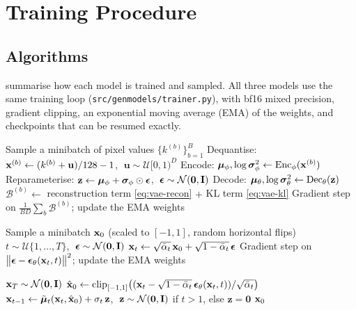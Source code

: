 \section{Training Procedure}
\label{sec:training}

\subsection{Algorithms}
 summarise how each model is trained and sampled.
All three models use the same training loop (\texttt{src/genmodels/trainer.py}), with bf16 mixed precision,
gradient clipping, an exponential moving average (EMA) of the weights, and checkpoints that can be resumed exactly.

\begin{algorithm}[H]
\caption{VAE training (one step, both VAE variants)}
\label{alg:vae-train}
\begin{algorithmic}[1]
\State Sample a minibatch of pixel values $\{k^{(b)}\}_{b=1}^{B}$
\State Dequantise: $\mathbf{x}^{(b)} \gets (k^{(b)}+\mathbf{u})/128-1$, $\;\mathbf{u}\sim\mathcal{U}[0,1)^{D}$
\State Encode: $\bm{\mu}_\phi,\log\bm{\sigma}^2_\phi \gets \mathrm{Enc}_\phi(\mathbf{x}^{(b)})$
\State Reparameterise: $\mathbf{z} \gets \bm{\mu}_\phi + \bm{\sigma}_\phi\odot\bm{\epsilon}$, $\;\bm{\epsilon}\sim\mathcal{N}(\mathbf{0},\mathbf{I})$
\State Decode: $\bm{\mu}_\theta,\log\bm{\sigma}^2_\theta \gets \mathrm{Dec}_\theta(\mathbf{z})$
\State $\mathcal{B}^{(b)} \gets$ reconstruction term \eqref{eq:vae-recon} $+$ KL term \eqref{eq:vae-kl} 
\State Gradient step on $\frac{1}{BD}\sum_b \mathcal{B}^{(b)}$; update the EMA weights
\end{algorithmic}
\end{algorithm}

\begin{algorithm}[H]
\caption{DDPM training with $L_\text{simple}$~\citep{ho2020ddpm}}
\label{alg:ddpm-train}
\begin{algorithmic}[1]
\State Sample a minibatch $\mathbf{x}_0$ (scaled to $[-1,1]$, random horizontal flips)
\State $t\sim\mathcal{U}\{1,\dots,T\}$, $\;\bm{\epsilon}\sim\mathcal{N}(\mathbf{0},\mathbf{I})$ 
\State $\mathbf{x}_t \gets \sqrt{\bar{\alpha}_t}\,\mathbf{x}_0 + \sqrt{1-\bar{\alpha}_t}\,\bm{\epsilon}$ 
\State Gradient step on $\big\|\bm{\epsilon}-\bm{\epsilon}_\theta(\mathbf{x}_t,t)\big\|^2$; update the EMA weights
\end{algorithmic}
\end{algorithm}

\begin{algorithm}[H]
\caption{DDPM ancestral sampling (paper's sampler, $T=1000$ network evaluations)}
\label{alg:ddpm-sample}
\begin{algorithmic}[1]
\State $\mathbf{x}_T\sim\mathcal{N}(\mathbf{0},\mathbf{I})$
  \State $\hat{\mathbf{x}}_0 \gets \operatorname{clip}_{[-1,1]}\!\big((\mathbf{x}_t-\sqrt{1-\bar{\alpha}_t}\,\bm{\epsilon}_\theta(\mathbf{x}_t,t))/\sqrt{\bar{\alpha}_t}\big)$
  \State $\mathbf{x}_{t-1} \gets \tilde{\bm{\mu}}_t(\mathbf{x}_t,\hat{\mathbf{x}}_0) + \sigma_t\,\mathbf{z}$, $\;\mathbf{z}\sim\mathcal{N}(\mathbf{0},\mathbf{I})$ if $t>1$, else $\mathbf{z}=\mathbf{0}$ 
\EndFor
\State \Return $\mathbf{x}_0$
\end{algorithmic}
\end{algorithm}

